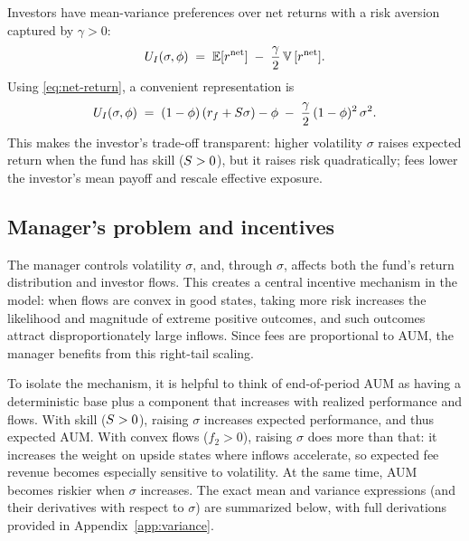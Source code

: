 Investors have mean-variance preferences over net returns with a risk aversion captured by $\gamma>0$:
\begin{equation}
\label{eq:UI}
    U_I(\sigma,\phi)\;=\;\mathbb{E}[r^{\text{net}}] \;-\; \frac{\gamma}{2}\,{\mathbb{V}}\,[r^{\text{net}}].
\end{equation}
Using \eqref{eq:net-return}, a convenient representation is
\begin{equation}
\label{eq:UI-expanded}
U_I(\sigma,\phi) \;=\; (1-\phi)\,(r_f+S\sigma) - \phi \;-\; \frac{\gamma}{2}\,(1-\phi)^2\,\sigma^2.
\end{equation}
This makes the investor's trade-off transparent: higher volatility $\sigma$ raises expected return when the fund has skill ($S>0$), but it raises risk quadratically; fees lower the investor's mean payoff and rescale effective exposure.



\subsection{Manager's problem and incentives}
\label{sec:manager}

The manager controls volatility $\sigma$, and, through $\sigma$, affects both the fund's return distribution and investor flows. This creates a central incentive mechanism in the model: when flows are convex in good states, taking more risk increases the likelihood and magnitude of extreme positive outcomes, and such outcomes attract disproportionately large inflows. Since fees are proportional to AUM, the manager benefits from this right-tail scaling.

To isolate the mechanism, it is helpful to think of end-of-period AUM as having a deterministic base plus a component that increases with realized performance and flows. With skill ($S>0$), raising $\sigma$ increases expected performance, and thus expected AUM. With convex flows ($f_2>0$), raising $\sigma$ does more than that: it increases the weight on upside states where inflows accelerate, so expected fee revenue becomes especially sensitive to volatility. At the same time, AUM becomes riskier when $\sigma$ increases. The exact mean and variance expressions (and their derivatives with respect to $\sigma$) are summarized below, with full derivations provided in Appendix~\ref{app:variance}.

